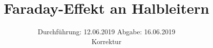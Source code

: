

\subject{V46}
\title{Faraday-Effekt an Halbleitern}
\date{%
  Durchführung: 12.06.2019
  \hspace{3em}
  Abgabe: 16.06.2019 \\
  Korrektur
}



\maketitle
\thispagestyle{empty}
\tableofcontents
\newpage






\printbibliography{}


